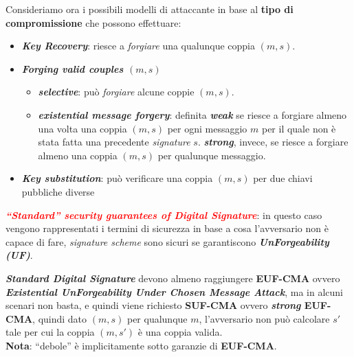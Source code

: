 \begin{flushleft}
    \newpage

    Consideriamo ora i possibili modelli di attaccante in base al \textbf{tipo di compromissione} che possono effettuare:

    {\centering
        \begin{minipage}[c]{0.75\textwidth}
            \begin{itemize}[nosep]
                \item \textbf{\textit{Key Recovery}}: riesce a \textit{forgiare} una qualunque coppia $(m, s)$.
                \item \textbf{\textit{Forging valid couples $(m, s)$}}
                \begin{itemize}[nosep]
                    \item \textbf{\textit{selective}}: può \textit{forgiare} alcune coppie $(m, s)$.
                    \item \textbf{\textit{existential message forgery}}: definita \textbf{\textit{weak}} se riesce a forgiare almeno una volta una coppia $(m, s)$ per ogni messaggio $m$ per il quale non è stata fatta una precedente \textit{signature} $s$. \textbf{\textit{strong}}, invece, se riesce a forgiare almeno una coppia $(m, s)$ per qualunque messaggio.
                \end{itemize}
                \item \textbf{\textit{Key substitution}}: può verificare una coppia $(m, s)$ per due chiavi pubbliche diverse
            \end{itemize}
        \end{minipage}
        \hfill
        \begin{minipage}[c]{0.1\textwidth}
            \centering
        \end{minipage}
    \par}
    
    \medskip

    \textcolor{red}{\textbf{\textit{``Standard'' security guarantees of Digital Signature}}}: in questo caso vengono rappresentati i termini di sicurezza in base a cosa l'avversario non è capace di fare, \textit{signature scheme} sono sicuri se garantiscono \textbf{\textit{UnForgeability (UF)}}.

    \smallskip

    \textbf{\textit{Standard Digital Signature}} devono almeno raggiungere \textbf{EUF-CMA} ovvero \textbf{\textit{Existential UnForgeability Under Chosen Message Attack}}, ma in alcuni scenari non basta, e quindi viene richiesto \textbf{SUF-CMA} ovvero \textbf{\textit{strong} EUF-CMA}, quindi dato $(m, s)$ per qualunque $m$, l'avversario non può calcolare $s'$ tale per cui la coppia $(m, s')$ è una coppia valida. \\
    \textbf{Nota}: ``debole'' è implicitamente sotto garanzie di \textbf{EUF-CMA}.
\end{flushleft}